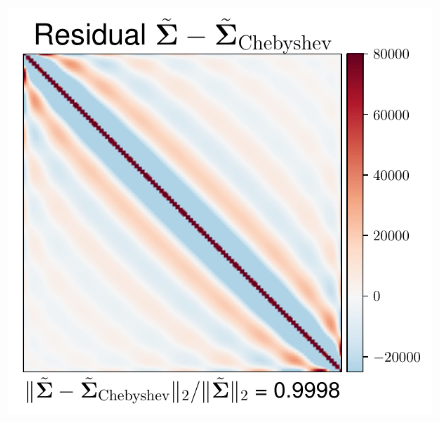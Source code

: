 \documentclass[aspectratio=169]{beamer}
\begin{document}
\begin{frame}
\begin{figure}
    \mbox{{\includegraphics[scale=0.3]{src/images/simu1_ex1_invA_Cheby.pdf}}}
  \end{figure}
\end{frame}
\end{document}
